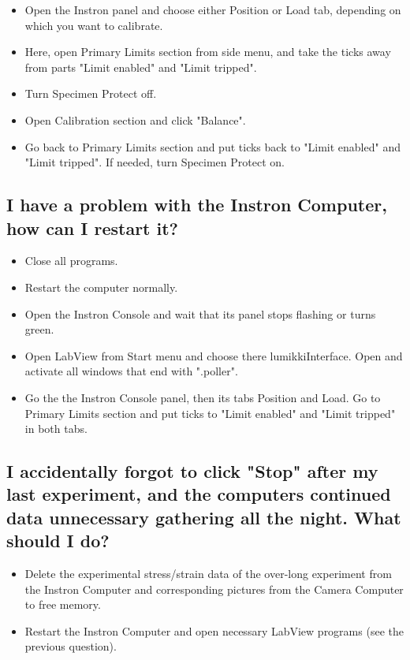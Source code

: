 \documentclass[a4paper]{article}
\begin{document}
\begin{itemize}  
  \item Open the Instron panel and choose either Position or Load tab, depending on which you want to calibrate.
  \item Here, open Primary Limits section from side menu, and take the ticks away from parts "Limit enabled" and "Limit tripped".
  \item Turn Specimen Protect off.
  \item Open Calibration section and click "Balance".
  \item Go back to Primary Limits section and put ticks back to "Limit enabled" and "Limit tripped". If needed, turn Specimen Protect on.
\end{itemize}

\subsection{I have a problem with the Instron Computer, how can I restart it?}

\begin{itemize}  
  \item Close all programs.
  \item Restart the computer normally.
  \item Open the Instron Console and wait that its panel stops flashing or turns green.
  \item Open LabView from Start menu and choose there lumikkiInterface. Open and activate all windows that end with ".poller".
  \item Go the the Instron Console panel, then its tabs Position and Load. Go to Primary Limits section and put ticks to "Limit enabled" and "Limit tripped" in both tabs.
\end{itemize}

\subsection{I accidentally forgot to click "Stop" after my last experiment, and the computers continued data unnecessary gathering all the night. What should I do?}

\begin{itemize}  
  \item Delete the experimental stress/strain data of the over-long experiment from the Instron Computer and corresponding pictures from the Camera Computer to free memory.
  \item Restart the Instron Computer and open necessary LabView programs (see the previous question).
\end{itemize}
\end{document}
